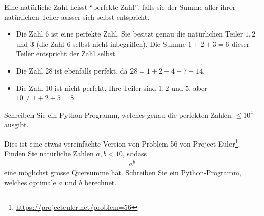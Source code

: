 \begin{mychallenge}
	Eine natürliche Zahl heisst \enquote{perfekte Zahl}, falls sie der Summe aller ihrer natürlichen Teiler ausser sich selbst entspricht.

	\begin{itemize}
		\item Die Zahl 6 ist eine perfekte Zahl. Sie besitzt genau die natürlichen Teiler $1, 2$ und $3$ (die Zahl $6$ selbst nicht inbegriffen). Die Summe $1 + 2 + 3 = 6$ dieser Teiler entspricht der Zahl selbst.
		\item Die Zahl 28 ist ebenfalls perfekt, da $28 = 1 + 2 + 4 + 7 + 14$.
		\item Die Zahl 10 ist nicht perfekt. Ihre Teiler sind $1, 2$ und $5$, aber $10 \neq 1 + 2 + 5 = 8$.
	\end{itemize}

	Schreiben Sie ein Python-Programm, welches genau die perfekten Zahlen $\leq 10^4$ ausgibt.
	\begin{myanswer}
		
	\end{myanswer}
\end{mychallenge}

\begin{mychallenge}
	Dies ist eine etwas vereinfachte Version von Problem 56 von Project Euler\footnote{\url{https://projecteuler.net/problem=56}}. Finden Sie natürliche Zahlen $a, b < 10$, sodass
	\begin{align*}
		a^b
	\end{align*}
	eine möglichst grosse Quersumme hat. Schreiben Sie ein Python-Programm, welches optimale $a$ und $b$ berechnet.
	\begin{myanswer}
		
	\end{myanswer}
\end{mychallenge}